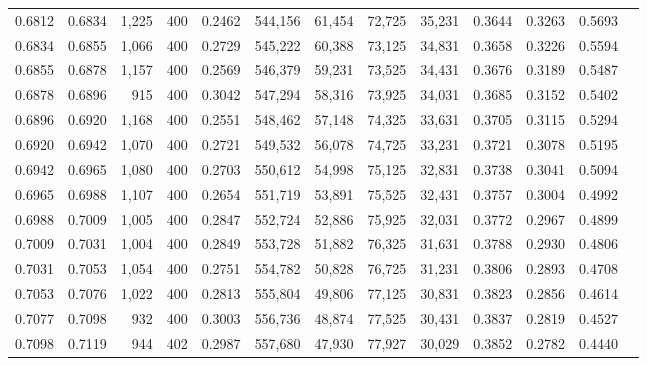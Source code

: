 \begin{tabular}{rrrrrrrrrrrrr}
0.6812 & 0.6834 &  1,225 & 400 &                                     0.2462 & 544,156 &  61,454 &  72,725 &  35,231 & 0.3644 & 0.3263 & 0.5693 \\
0.6834 & 0.6855 &  1,066 & 400 &                                     0.2729 & 545,222 &  60,388 &  73,125 &  34,831 & 0.3658 & 0.3226 & 0.5594 \\
0.6855 & 0.6878 &  1,157 & 400 &                                     0.2569 & 546,379 &  59,231 &  73,525 &  34,431 & 0.3676 & 0.3189 & 0.5487 \\
0.6878 & 0.6896 &    915 & 400 &                                     0.3042 & 547,294 &  58,316 &  73,925 &  34,031 & 0.3685 & 0.3152 & 0.5402 \\
0.6896 & 0.6920 &  1,168 & 400 &                                     0.2551 & 548,462 &  57,148 &  74,325 &  33,631 & 0.3705 & 0.3115 & 0.5294 \\
0.6920 & 0.6942 &  1,070 & 400 &                                     0.2721 & 549,532 &  56,078 &  74,725 &  33,231 & 0.3721 & 0.3078 & 0.5195 \\
0.6942 & 0.6965 &  1,080 & 400 &                                     0.2703 & 550,612 &  54,998 &  75,125 &  32,831 & 0.3738 & 0.3041 & 0.5094 \\
0.6965 & 0.6988 &  1,107 & 400 &                                     0.2654 & 551,719 &  53,891 &  75,525 &  32,431 & 0.3757 & 0.3004 & 0.4992 \\
0.6988 & 0.7009 &  1,005 & 400 &                                     0.2847 & 552,724 &  52,886 &  75,925 &  32,031 & 0.3772 & 0.2967 & 0.4899 \\
0.7009 & 0.7031 &  1,004 & 400 &                                     0.2849 & 553,728 &  51,882 &  76,325 &  31,631 & 0.3788 & 0.2930 & 0.4806 \\
0.7031 & 0.7053 &  1,054 & 400 &                                     0.2751 & 554,782 &  50,828 &  76,725 &  31,231 & 0.3806 & 0.2893 & 0.4708 \\
0.7053 & 0.7076 &  1,022 & 400 &                                     0.2813 & 555,804 &  49,806 &  77,125 &  30,831 & 0.3823 & 0.2856 & 0.4614 \\
0.7077 & 0.7098 &    932 & 400 &                                     0.3003 & 556,736 &  48,874 &  77,525 &  30,431 & 0.3837 & 0.2819 & 0.4527 \\
0.7098 & 0.7119 &    944 & 402 &                                     0.2987 & 557,680 &  47,930 &  77,927 &  30,029 & 0.3852 & 0.2782 & 0.4440 \\

\end{tabular}
